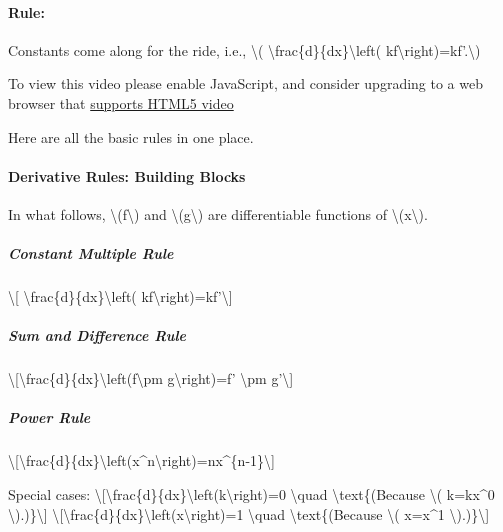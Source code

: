 \hypertarget{rule-2}{%
\paragraph{Rule:}\label{rule-2}}

Constants come along for the ride, i.e., \textbackslash{}(
\textbackslash{}frac\{d\}\{dx\}\textbackslash{}left(
kf\textbackslash{}right)=kf'.\textbackslash{})

To view this video please enable JavaScript, and consider upgrading to a
web browser that \href{http://videojs.com/html5-video-support/}{supports
HTML5 video}

Here are all the basic rules in one place.

\hypertarget{derivative-rules-building-blocks}{%
\paragraph{Derivative Rules: Building
Blocks}\label{derivative-rules-building-blocks}}

In what follows, \textbackslash{}(f\textbackslash{}) and
\textbackslash{}(g\textbackslash{}) are differentiable functions of
\textbackslash{}(x\textbackslash{}).

\hypertarget{constant-multiple-rule}{%
\subparagraph{Constant Multiple Rule}\label{constant-multiple-rule}}

\textbackslash{}{[} \textbackslash{}frac\{d\}\{dx\}\textbackslash{}left(
kf\textbackslash{}right)=kf'\textbackslash{}{]}

\hypertarget{sum-and-difference-rule}{%
\subparagraph{Sum and Difference Rule}\label{sum-and-difference-rule}}

\textbackslash{}{[}\textbackslash{}frac\{d\}\{dx\}\textbackslash{}left(f\textbackslash{}pm
g\textbackslash{}right)=f' \textbackslash{}pm g'\textbackslash{}{]}

\hypertarget{power-rule-1}{%
\subparagraph{Power Rule}\label{power-rule-1}}

\textbackslash{}{[}\textbackslash{}frac\{d\}\{dx\}\textbackslash{}left(x\^{}n\textbackslash{}right)=nx\^{}\{n-1\}\textbackslash{}{]}

Special cases:
\textbackslash{}{[}\textbackslash{}frac\{d\}\{dx\}\textbackslash{}left(k\textbackslash{}right)=0
\textbackslash{}quad \textbackslash{}text\{(Because \textbackslash{}(
k=kx\^{}0 \textbackslash{}).)\}\textbackslash{}{]}
\textbackslash{}{[}\textbackslash{}frac\{d\}\{dx\}\textbackslash{}left(x\textbackslash{}right)=1
\textbackslash{}quad \textbackslash{}text\{(Because \textbackslash{}(
x=x\^{}1 \textbackslash{}).)\}\textbackslash{}{]}

